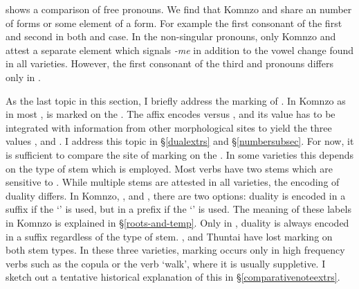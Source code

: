  shows a comparison of free pronouns. We find that Komnzo and  share an number of forms or some element of a form. For example the first consonant of the first and second  in both  and  case. In the  non-singular pronouns, only Komnzo and  attest a separate element which signals  \emph{-me} in addition to the vowel change found in all varieties. However, the first consonant of the third   and  pronouns differs only in .%

As the last topic in this section, I briefly address the marking of  . In Komnzo as in most ,   is marked on the . The affix encodes  versus  , and its value has to be integrated with information from other morphological sites to yield the three  values ,  and . I address this topic in \S\ref{dualextrs} and \S\ref{numbersubsec}. For now, it is sufficient to compare the site of  marking on the . In some varieties this depends on the type of  stem which is employed. Most verbs have two stems which are sensitive to . While multiple  stems are attested in all  varieties, the encoding of duality differs. In Komnzo, ,  and , there are two options: duality is encoded in a suffix if the `' is used, but in a prefix if the `' is used. The meaning of these labels in Komnzo is explained in \S\ref{roots-and-temp}. Only in , duality is always encoded in a suffix regardless of the type of stem. ,  and  Thuntai have lost  marking on both stem types. In these three varieties,  marking occurs only in high frequency verbs such as the copula or the verb `walk', where it is usually suppletive. I sketch out a tentative historical explanation of this in \S\ref{comparativenoteextrs}.


